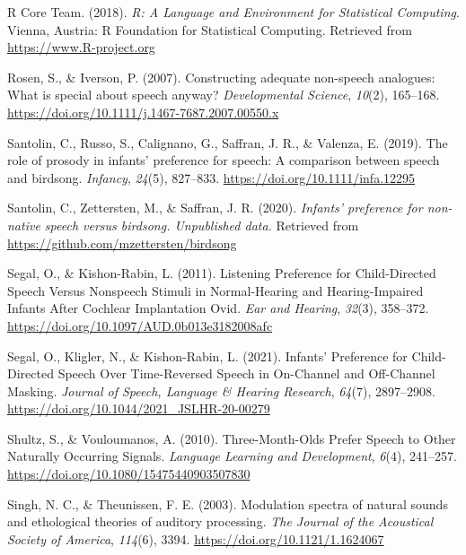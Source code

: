 \documentclass[
  man,mask,floatsintext]{apa6}
\newlength{\cslhangindent}
\newlength{\cslentryspacingunit} %
\newenvironment{CSLReferences}[2] %
 {%
  \setlength{\parindent}{0pt}
  \ifodd #1
  \let\oldpar\par
  \def\par{\hangindent=\cslhangindent\oldpar}
  \fi
  \setlength{\parskip}{#2\cslentryspacingunit}
 }%
 {}
\begin{document}
\begin{CSLReferences}{1}{0}
\leavevmode{}%
R Core Team. (2018). \emph{R: {A} {Language} and {Environment} for {Statistical} {Computing}}. Vienna, Austria: R Foundation for Statistical Computing. Retrieved from \url{https://www.R-project.org}

\leavevmode{}%
Rosen, S., \& Iverson, P. (2007). Constructing adequate non-speech analogues: What is special about speech anyway? \emph{Developmental Science}, \emph{10}(2), 165--168. \url{https://doi.org/10.1111/j.1467-7687.2007.00550.x}

\leavevmode{}%
Santolin, C., Russo, S., Calignano, G., Saffran, J. R., \& Valenza, E. (2019). The role of prosody in infants' preference for speech: {A} comparison between speech and birdsong. \emph{Infancy}, \emph{24}(5), 827--833. \url{https://doi.org/10.1111/infa.12295}

\leavevmode{}%
Santolin, C., Zettersten, M., \& Saffran, J. R. (2020). \emph{Infants' preference for non-native speech versus birdsong. {Unpublished} data.} Retrieved from \url{https://github.com/mzettersten/birdsong}

\leavevmode{}%
Segal, O., \& Kishon-Rabin, L. (2011). Listening {Preference} for {Child}-{Directed} {Speech} {Versus} {Nonspeech} {Stimuli} in {Normal}-{Hearing} and {Hearing}-{Impaired} {Infants} {After} {Cochlear} {Implantation} {\textbar} {Ovid}. \emph{Ear and Hearing}, \emph{32}(3), 358--372. \url{https://doi.org/10.1097/AUD.0b013e3182008afc}

\leavevmode{}%
Segal, O., Kligler, N., \& Kishon-Rabin, L. (2021). Infants' {Preference} for {Child}-{Directed} {Speech} {Over} {Time}-{Reversed} {Speech} in {On}-{Channel} and {Off}-{Channel} {Masking}. \emph{Journal of Speech, Language \& Hearing Research}, \emph{64}(7), 2897--2908. \url{https://doi.org/10.1044/2021_JSLHR-20-00279}

\leavevmode{}%
Shultz, S., \& Vouloumanos, A. (2010). Three-{Month}-{Olds} {Prefer} {Speech} to {Other} {Naturally} {Occurring} {Signals}. \emph{Language Learning and Development}, \emph{6}(4), 241--257. \url{https://doi.org/10.1080/15475440903507830}

\leavevmode{}%
Singh, N. C., \& Theunissen, F. E. (2003). Modulation spectra of natural sounds and ethological theories of auditory processing. \emph{The Journal of the Acoustical Society of America}, \emph{114}(6), 3394. \url{https://doi.org/10.1121/1.1624067}


\end{CSLReferences}
\end{document}
